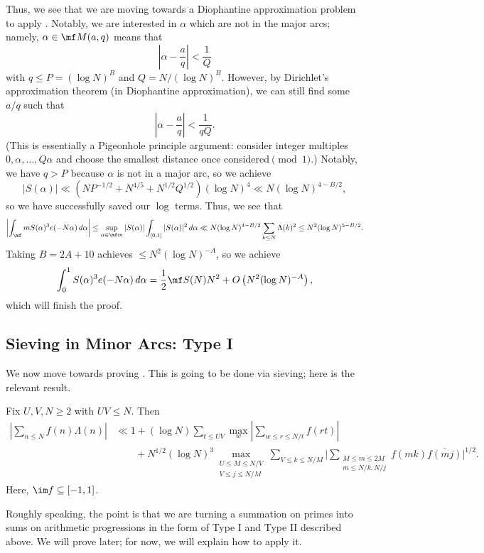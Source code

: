 \documentclass[../notes.tex]{subfiles}
\begin{document}
Thus, we see that we are moving towards a Diophantine approximation problem to apply . Notably, we are interested in $\alpha$ which are not in the major arcs; namely, $\alpha\in\mf M(a,q)$ means that
\[\left|\alpha-\frac aq\right|<\frac1Q\]
with $q\le P=(\log N)^B$ and $Q=N/(\log N)^B$. However, by Dirichlet's approximation theorem (in Diophantine approximation), we can still find some $a/q$ such that
\[\left|\alpha-\frac aq\right|<\frac1{qQ}.\]
(This is essentially a Pigeonhole principle argument: consider integer multiples $0,\alpha,\ldots,Q\alpha$ and choose the smallest distance once considered$\pmod1$.) Notably, we have $q>P$ because $\alpha$ is not in a major arc, so we achieve
\[|S(\alpha)|\ll\left(NP^{-1/2}+N^{4/5}+N^{1/2}Q^{1/2}\right)(\log N)^4\ll N(\log N)^{4-B/2},\]
so we have successfully saved our $\log$ terms. Thus, we see that
\[\left|\int_\mf mS(\alpha)^3e(-N\alpha)\,d\alpha\right|\le\sup_{\alpha\in\mf m}|S(\alpha)|\int_{[0,1]}|S(\alpha)|^2\,d\alpha\ll N(\log N)^{4-B/2}\sum_{k\le N}\Lambda(k)^2\le N^2(\log N)^{5-B/2}.\]
Taking $B=2A+10$ achieves $\le N^2(\log N)^{-A}$, so we achieve
\[\int_0^1S(\alpha)^3e(-N\alpha)\,d\alpha=\frac12\mf S(N)N^2+O\left(N^2(\log N)^{-A}\right),\]
which will finish the proof.

\subsection{Sieving in Minor Arcs: Type I}
We now move towards proving . This is going to be done via sieving; here is the relevant result.
\begin{theorem} \label{thm:vinogradov-sieve}
	Fix $U,V,N\ge2$ with $UV\le N$. Then
	\begin{align*}
		\left|\sum_{n\le N}f(n)\Lambda(n)\right| &\ll 1+(\log N)\sum_{t\le UV}\max_w\left|\sum_{w\le r\le N/t}f(rt)\right| \\
		&\qquad+N^{1/2}(\log N)^3\max_{\substack{U\le M\le N/V\\V\le j\le N/M}}\sum_{V\le k\le N/M}\Bigg|\sum_{\substack{M\le m\le2M\\m\le N/k,N/j}}f(mk)\overline{f(mj)}\Bigg|^{1/2}.
	\end{align*}
	Here, $\im f\subseteq[-1,1]$.
\end{theorem}
Roughly speaking, the point is that we are turning a summation on primes into sums on arithmetic progressions in the form of Type I and Type II described above. We will prove  later; for now, we will explain how to apply it.
\end{document}
